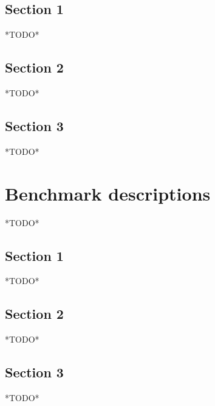 \documentclass[12pt,twoside,notitlepage]{report}
\begin{document}
    \section{Section 1}
    *TODO*

    \section{Section 2}
    *TODO*

    \section{Section 3}
    *TODO* \cite{Luthman:2015:hyperspectralImager}











\cleardoublepage
{}

\cleardoublepage










\appendix


\cleardoublepage
\chapter {Benchmark descriptions}
    *TODO*

    \section{Section 1}
    *TODO*

    \section{Section 2}
    *TODO*

    \section{Section 3}
    *TODO*
\end{document}
